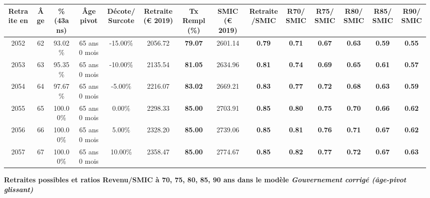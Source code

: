 \begin{adjustbox}{max width=\textwidth} 
\begin{tabular}[htb]{|c|c||c|c|c||c|c||c|c||c|c|c|c|c|} 
\hline 
 Retraite en &  Âge &  \%(43ans) &  Âge pivot &  Décote/Surcote &  Retraite (\euro{} 2019) &  Tx Rempl(\%) &  SMIC (\euro{} 2019) &  Retraite/SMIC &  R70/SMIC &  R75/SMIC &  R80/SMIC &  R85/SMIC &  R90/SMIC \\ 
\hline \hline 
 2052 &  62 &  93.02\% &  65 ans 0 mois &  -15.00\% &  2056.72 &  {\bf 79.07} &  2601.14 &  {\bf {\color{red} 0.79}} &  {\bf {\color{red} 0.71}} &  {\bf {\color{red} 0.67}} &  {\bf {\color{red} 0.63}} &  {\bf {\color{red} 0.59}} &  {\bf {\color{red} 0.55}} \\ 
\hline 
 2053 &  63 &  95.35\% &  65 ans 0 mois &  -10.00\% &  2135.54 &  {\bf 81.05} &  2634.96 &  {\bf {\color{red} 0.81}} &  {\bf {\color{red} 0.74}} &  {\bf {\color{red} 0.69}} &  {\bf {\color{red} 0.65}} &  {\bf {\color{red} 0.61}} &  {\bf {\color{red} 0.57}} \\ 
\hline 
 2054 &  64 &  97.67\% &  65 ans 0 mois &  -5.00\% &  2216.07 &  {\bf 83.02} &  2669.21 &  {\bf {\color{red} 0.83}} &  {\bf {\color{red} 0.77}} &  {\bf {\color{red} 0.72}} &  {\bf {\color{red} 0.68}} &  {\bf {\color{red} 0.63}} &  {\bf {\color{red} 0.59}} \\ 
\hline 
 2055 &  65 &  100.00\% &  65 ans 0 mois &  0.00\% &  2298.33 &  {\bf 85.00} &  2703.91 &  {\bf {\color{red} 0.85}} &  {\bf {\color{red} 0.80}} &  {\bf {\color{red} 0.75}} &  {\bf {\color{red} 0.70}} &  {\bf {\color{red} 0.66}} &  {\bf {\color{red} 0.62}} \\ 
\hline 
 2056 &  66 &  100.00\% &  65 ans 0 mois &  5.00\% &  2328.20 &  {\bf 85.00} &  2739.06 &  {\bf {\color{red} 0.85}} &  {\bf {\color{red} 0.81}} &  {\bf {\color{red} 0.76}} &  {\bf {\color{red} 0.71}} &  {\bf {\color{red} 0.67}} &  {\bf {\color{red} 0.62}} \\ 
\hline 
 2057 &  67 &  100.00\% &  65 ans 0 mois &  10.00\% &  2358.47 &  {\bf 85.00} &  2774.67 &  {\bf {\color{red} 0.85}} &  {\bf {\color{red} 0.82}} &  {\bf {\color{red} 0.77}} &  {\bf {\color{red} 0.72}} &  {\bf {\color{red} 0.67}} &  {\bf {\color{red} 0.63}} \\ 
\hline 
\hline 
\end{tabular} 
\end{adjustbox} 
 
 \vspace{0.1cm} 
{\bf \noindent Retraites possibles et ratios Revenu/SMIC à 70, 75, 80, 85, 90 ans dans le modèle \emph{Gouvernement corrigé (âge-pivot glissant)}}  
 
